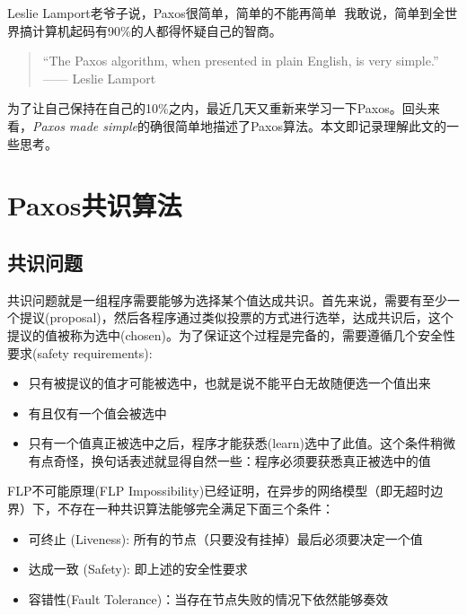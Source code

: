 \documentclass[12pt]{article}
\begin{document}
\makeblogtitle

Leslie Lamport老爷子说，Paxos很简单，简单的不能再简单🐶 我敢说，简单到全世界搞计算机起码有90\%的人都得怀疑自己的智商。

\begin{quote}
``The Paxos algorithm, when presented in plain English, is very simple.'' ------ Leslie Lamport
\end{quote}

为了让自己保持在自己的10\%之内，最近几天又重新来学习一下Paxos。回头来看，\emph{Paxos made simple}的确很简单地描述了Paxos算法。本文即记录理解此文的一些思考。

\section{Paxos共识算法}\label{paxosux5171ux8bc6ux7b97ux6cd5}

\subsection{共识问题}\label{ux5171ux8bc6ux95eeux9898}

共识问题就是一组程序需要能够为选择某个值达成共识。首先来说，需要有至少一个提议(proposal)，然后各程序通过类似投票的方式进行选举，达成共识后，这个提议的值被称为选中(chosen)。为了保证这个过程是完备的，需要遵循几个安全性要求(safety requirements):

\begin{itemize}
\tightlist
\item
  只有被提议的值才可能被选中，也就是说不能平白无故随便选一个值出来
\item
  有且仅有一个值会被选中
\item
  只有一个值真正被选中之后，程序才能获悉(learn)选中了此值。这个条件稍微有点奇怪，换句话表述就显得自然一些：程序必须要获悉真正被选中的值
\end{itemize}

FLP不可能原理(FLP Impossibility)已经证明，在异步的网络模型（即无超时边界）下，不存在一种共识算法能够完全满足下面三个条件：

\begin{itemize}
\tightlist
\item
  可终止 (Liveness): 所有的节点（只要没有挂掉）最后必须要决定一个值
\item
  达成一致 (Safety): 即上述的安全性要求
\item
  容错性(Fault Tolerance)：当存在节点失败的情况下依然能够奏效
\end{itemize}
\end{document}
